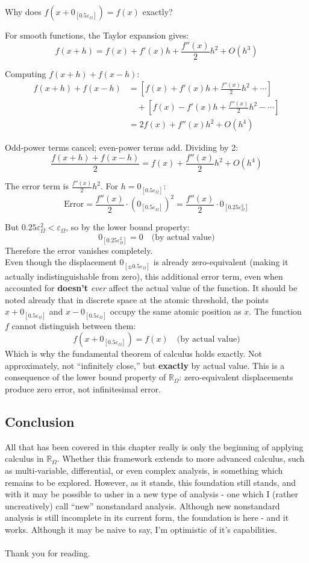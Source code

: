 \documentclass{article}
\begin{document}
Why does $f(x + 0_{[0.5\varepsilon_\Omega]}) = f(x)$ exactly?

For smooth functions, the Taylor expansion gives:
$$f(x + h) = f(x) + f'(x)h + \frac{f''(x)}{2}h^2 + O(h^3)$$

Computing $f(x + h) + f(x - h)$:
\begin{align*}
f(x + h) + f(x - h) &= \left[f(x) + f'(x)h + \frac{f''(x)}{2}h^2 + \cdots\right] \\
&\quad + \left[f(x) - f'(x)h + \frac{f''(x)}{2}h^2 - \cdots\right] \\
&= 2f(x) + f''(x)h^2 + O(h^4)
\end{align*}

Odd-power terms cancel; even-power terms add. Dividing by 2:
$$\frac{f(x + h) + f(x - h)}{2} = f(x) + \frac{f''(x)}{2}h^2 + O(h^4)$$

The error term is $\frac{f''(x)}{2}h^2$. For $h = 0_{[0.5\varepsilon_\Omega]}$:
$$\text{Error} = \frac{f''(x)}{2} \cdot (0_{[0.5\varepsilon_\Omega]})^2 = \frac{f''(x)}{2} \cdot 0_{[0.25\varepsilon_\Omega^2]}$$

But $0.25\varepsilon_\Omega^2 < \varepsilon_\Omega$, so by the lower bound property:
$$0_{[0.25\varepsilon_\Omega^2]} = 0 \quad \text{(by actual value)}$$Therefore the error vanishes completely.\\Even though the displacement $0_{[\pm 0.5\varepsilon_\Omega]}$ is already zero-equivalent (making it actually indistinguishable from zero), this additional error term, even when accounted for \textbf{doesn't} \textit{ever} affect the actual value of the function. It should be noted already that in discrete space at the atomic threshold, the points $x + 0_{[0.5\varepsilon_\Omega]}$ and $x - 0_{[0.5\varepsilon_\Omega]}$ occupy the same atomic position as $x$. The function $f$ cannot distinguish between them:
$$f(x + 0_{[0.5\varepsilon_\Omega]}) = f(x) \quad \text{(by actual value)}$$Which is why the fundamental theorem of calculus holds exactly. Not approximately, not ``infinitely close,'' but \textbf{exactly} by actual value. This is a consequence of the lower bound property of $\mathbb{R}_\Omega$: zero-equivalent displacements produce zero error, not infinitesimal error.

\subsection{Conclusion}

All that has been covered in this chapter really is only the beginning of applying calculus in $\mathbb{R}_\Omega$. Whether this framework extends to more advanced calculus, such as multi-variable, differential, or even complex analysis, is something which remains to be explored. However, as it stands, this foundation still stands, and with it may be possible to usher in a new type of analysis - one which I (rather uncreatively) call ``new'' nonstandard analysis. Although new nonstandard analysis is still incomplete in its current form, the foundation is here - and it works. Although it may be naive to say, I'm optimistic of it's capabilities.\\\\Thank you for reading.
\newpage


\end{document}
